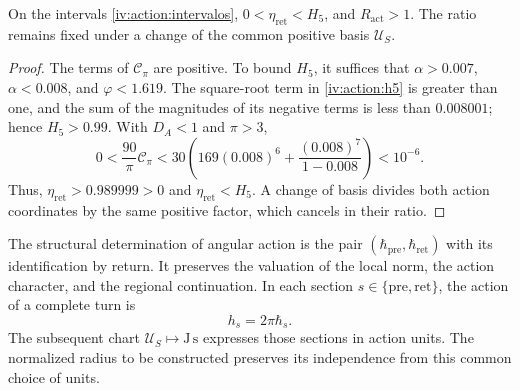 \begin{proposition}
\label{iv:action:positividad}
On the intervals \eqref{iv:action:intervalos},
\(0<\eta_{\mathrm{ret}}<H_5\), and \(R_{\mathrm{act}}>1\).
The ratio remains fixed under a change of the common positive basis
\(\mathcal U_S\).
\end{proposition}
\begin{proof}
The terms of \(\mathcal C_\pi\) are positive. To bound
\(H_5\), it suffices that \(\alpha>0.007\), \(\alpha<0.008\), and
\(\varphi<1.619\). The square-root term in \eqref{iv:action:h5}
is greater than one, and the sum of the magnitudes of its negative terms is less
than \(0.008001\); hence \(H_5>0.99\).
With \(D_A<1\) and \(\pi>3\),
\[
 0<\frac{90}{\pi}\mathcal C_\pi
 <30\left(169(0.008)^6+
             \frac{(0.008)^7}{1-0.008}\right)<10^{-6}.
\]
Thus, \(\eta_{\mathrm{ret}}>0.989999>0\) and
\(\eta_{\mathrm{ret}}<H_5\). A change of basis divides both
action coordinates by the same positive factor, which
cancels in their ratio.
\end{proof}

The structural determination of angular action is the pair
\((\hbar_{\mathrm{pre}},\hbar_{\mathrm{ret}})\) with its
identification by return. It preserves the valuation of the local
norm, the action character, and the regional continuation.
In each section \(s\in\{\mathrm{pre},\mathrm{ret}\}\), the action
of a complete turn is
\begin{equation}
 h_s=2\pi\hbar_s.
 \label{iv:action:vuelta}
\end{equation}
The subsequent chart \(\mathcal U_S\mapsto\mathrm{J\,s}\) expresses
those sections in action units. The normalized radius to be
constructed preserves its independence from this common choice
of units.
